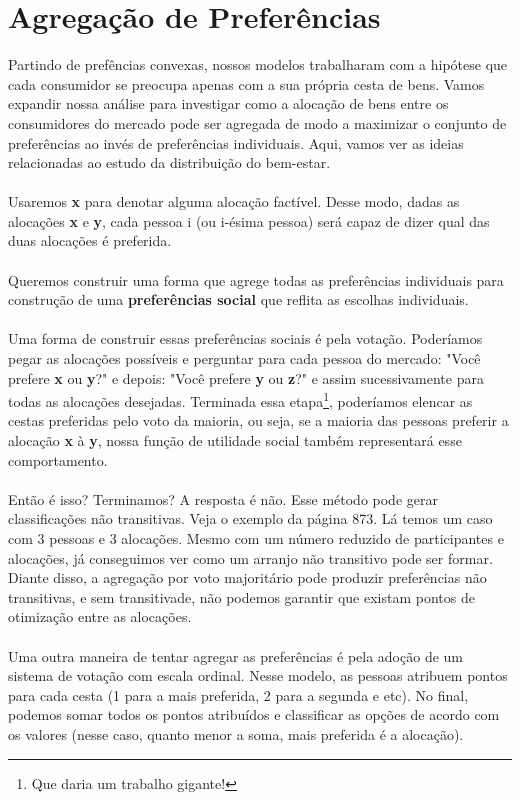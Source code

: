 \documentclass[a4paper,11pt,oneside]{book}
\theoremstyle{definition}
\theoremstyle{break}
\begin{document}
\section{Agregação de Preferências}

Partindo de prefências convexas, nossos modelos trabalharam com a hipótese que cada consumidor se preocupa apenas com a sua própria cesta de bens. Vamos expandir nossa análise para investigar como a alocação de bens entre os consumidores do mercado pode ser agregada de modo a maximizar o conjunto de preferências ao invés de preferências individuais. Aqui, vamos ver as ideias relacionadas ao estudo da distribuição do bem-estar.
\\~\\
Usaremos \textbf{x} para denotar alguma alocação factível. Desse modo, dadas as alocações \textbf{x} e \textbf{y}, cada pessoa i (ou i-ésima pessoa) será capaz de dizer qual das duas alocações é preferida.
\\~\\
Queremos construir uma forma que agrege todas as preferências individuais para construção de uma \textbf{preferências social} que reflita as escolhas individuais.
\\~\\
Uma forma de construir essas preferências sociais é pela votação. Poderíamos pegar as alocações possíveis e perguntar para cada pessoa do mercado: "Você prefere \textbf{x} ou \textbf{y}?" e depois: "Você prefere \textbf{y} ou \textbf{z}?" e assim sucessivamente para todas as alocações desejadas. Terminada essa etapa\footnote{Que daria um trabalho gigante!}, poderíamos elencar as cestas preferidas pelo voto da maioria, ou seja, se a maioria das pessoas preferir a alocação \textbf{x} à \textbf{y}, nossa função de utilidade social também representará esse comportamento.
\\~\\
Então é isso? Terminamos? A resposta é não. Esse método pode gerar classificações não transitivas. Veja o exemplo da página 873. Lá temos um caso com 3 pessoas e 3 alocações. Mesmo com um número reduzido de participantes e alocações, já conseguimos ver como um arranjo não transitivo pode ser formar. Diante disso, a agregação por voto majoritário pode produzir preferências não transitivas, e sem transitivade, não podemos garantir que existam pontos de otimização entre as alocações.
\\~\\
Uma outra maneira de tentar agregar as preferências é pela adoção de um sistema de votação com escala ordinal. Nesse modelo, as pessoas atribuem pontos para cada cesta (1 para a mais preferida, 2 para a segunda e etc). No final, podemos somar todos os pontos atribuídos e classificar as opções de acordo com os valores (nesse caso, quanto menor a soma, mais preferida é a alocação).
\end{document}

